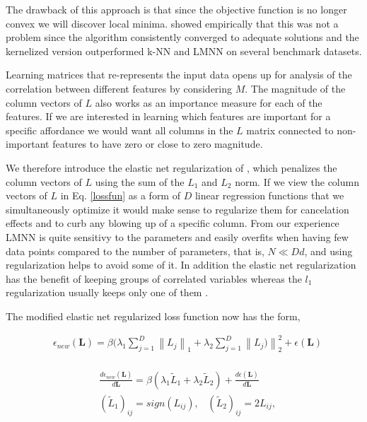 The drawback of this approach is that since the objective function is no
longer convex we will discover local minima. \cite{Torresani:2006wb}
showed empirically that this was not a problem since the algorithm
consistently converged to adequate solutions and the kernelized version
outperformed k-NN and LMNN on several benchmark datasets.

Learning matrices that re-represents the input data opens up for
analysis of the correlation between different features by considering
\(M\). The magnitude of the column vectors of \(L\) also works as an
importance measure for each of the features. If we are interested in
learning which features are important for a specific affordance we would
want all columns in the \(L\) matrix connected to non-important features
to have zero or close to zero magnitude.

We therefore introduce the elastic net regularization of
\cite{Cimpoi:2015eg}, which penalizes the column vectors of \(L\) using
the sum of the \(L_1\) and \(L_2\) norm. If we view the column vectors
of \(L\) in Eq. \ref{lossfun} as a form of \(D\) linear regression
functions that we simultaneously optimize it would make sense to
regularize them for cancelation effects and to curb any blowing up of a
specific column. From our experience LMNN is quite sensitivy to the
parameters and easily overfits when having few data points compared to
the number of parameters, that is, \(N \ll Dd\), and using
regularization helps to avoid some of it. In addition the elastic net
regularization has the benefit of keeping groups of correlated variables
whereas the \(l_1\) regularization usually keeps only one of them
\cite{Cimpoi:2015eg}.

The modified elastic net regularized loss function now has the form,

\small 

\begin{equation}
\label{lossfun}
\begin{aligned}
& \epsilon_{new}(\mathbf{L}) = \beta(\lambda_1 \sum_{j=1}^{D} \left\lVert L_j  \right\rVert_1 + \lambda_2 \sum_{j=1}^{D} \left\lVert L_j)  \right\rVert_{2}^{2} + \epsilon(\mathbf{L}) \\
\end{aligned}
\end{equation}

\begin{equation}
\label{lossfunderivative}
\begin{aligned}
& \frac{d\epsilon_{new}(\mathbf{L})}{d\mathbf{L}} = \beta(\lambda_1  \tilde{L}_1 + \lambda_2  \tilde{L}_2) + \frac{d\epsilon(\mathbf{L})}{d\mathbf{L}} \\
& (\tilde{L}_1)_{ij} = sign(L_{ij}), \; \; \; (\tilde{L}_2)_{ij} = 2 L_{ij},
\end{aligned}
\end{equation}


